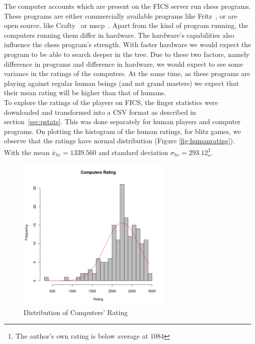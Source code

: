 \documentclass{article}
\begin{document}
The computer accounts which are present on the FICS server run chess programs. These programs are either commercially available programs like Fritz~\cite{web:fritz}, or are open source, like Crafty~\cite{web:crafty} or mscp~\cite{web:mscp}. Apart from the kind of program running, the computers running them differ in hardware. The hardware's capabilities also influence the chess program's strength. With faster hardware we would expect the program to be able to search deeper in the tree. Due to these two factors, namely difference in programs and difference in hardware, we would expect to see some variance in the ratings of the computers. At the same time, as these programs are playing against regular human beings (and not grand masters) we expect that their mean rating will be higher than that of humans. \\



To explore the ratings of the players on FICS, the finger statistics were downloaded and transformed into a CSV format as described in section~\ref{sec:pstats}. This was done separately for human players and computer programs. On plotting the histogram of the human ratings, for blitz games, we observe that the ratings have normal distribution (Figure \ref{fig:humanrating}). With the mean $\bar{x}_{hr} = 1339.560$ and standard deviation $\sigma_{hr} = 293.12$\footnote{The author's own rating is below average at 1084}.\\

\begin{figure} [htp]
\begin{center}
\includegraphics[width=3in]{computers_rating.png}
\end{center}
\caption{Distribution of Computers' Rating}
\label{fig:comprating}
\end{figure}
\end{document}
